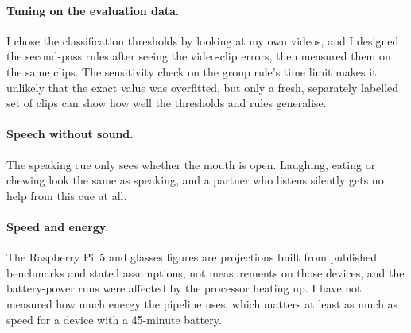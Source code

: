 \paragraph{Tuning on the evaluation data.}
I chose the classification thresholds by looking at my own videos, and I designed the
second-pass rules after seeing the video-clip errors, then measured them on the same
clips. The sensitivity check on the group rule's time limit makes it unlikely that the
exact value was overfitted, but only a fresh, separately labelled set of clips can show
how well the thresholds and rules generalise.

\paragraph{Speech without sound.}
The speaking cue only sees whether the mouth is open. Laughing, eating or chewing look the
same as speaking, and a partner who listens silently gets no help from this cue at all.

\paragraph{Speed and energy.}
The Raspberry Pi~5 and glasses figures are projections built from published benchmarks
and stated assumptions, not measurements on those devices, and the battery-power runs
were affected by the processor heating up. %
I have not measured how much energy the pipeline uses, which matters at least as much as
speed for a device with a 45-minute battery.
